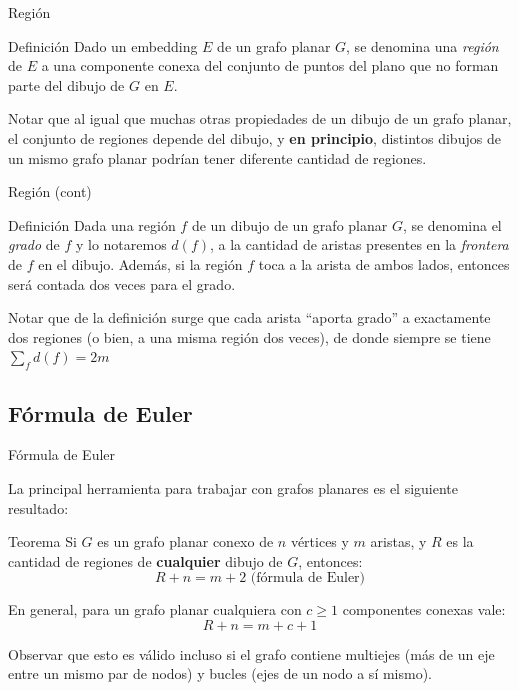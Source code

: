 \documentclass[compress]{beamer}
\begin{document}
\begin{frame}{Región}

\begin{block}{Definición}
    Dado un embedding $E$ de un grafo planar $G$, se denomina una \textit{región} de $E$ a una componente conexa del conjunto de puntos del plano que no forman parte del dibujo de $G$ en $E$.
\end{block}

Notar que al igual que muchas otras propiedades de un dibujo de un grafo planar, el conjunto de regiones depende del dibujo, y \textbf{en principio}, distintos dibujos de un mismo grafo planar podrían tener diferente cantidad de regiones.

\end{frame}

\begin{frame}{Región (cont)}

\begin{block}{Definición}
    Dada una región $f$ de un dibujo de un grafo planar $G$, se denomina el \textit{grado} de $f$ y lo notaremos $d(f)$, a la cantidad de aristas presentes en la \textit{frontera} de $f$ en el dibujo. Además, si la región $f$ toca
    a la arista de ambos lados, entonces será contada dos veces para el grado.
\end{block}

Notar que de la definición surge que cada arista ``aporta grado'' a exactamente dos regiones (o bien, a una misma región dos veces), de donde siempre se tiene $\sum_f {d(f)} = 2m$

\end{frame}

\subsection{Fórmula de Euler}

\begin{frame}{Fórmula de Euler}

La principal herramienta para trabajar con grafos planares es el siguiente resultado:

\begin{block}{Teorema}
    Si $G$ es un grafo planar conexo de $n$ vértices y $m$ aristas, y $R$ es la cantidad de regiones de \textbf{cualquier} dibujo de $G$, entonces:    
    $$R + n = m + 2 \mbox{ (fórmula de Euler)}$$
    
    En general, para un grafo planar cualquiera con $c \geq 1$ componentes conexas vale:    
    $$R + n = m + c + 1$$
\end{block}

Observar que esto es válido incluso si el grafo contiene multiejes (más de un eje entre un mismo par de nodos) y bucles (ejes de un nodo a sí mismo).

\end{frame}
\end{document}
